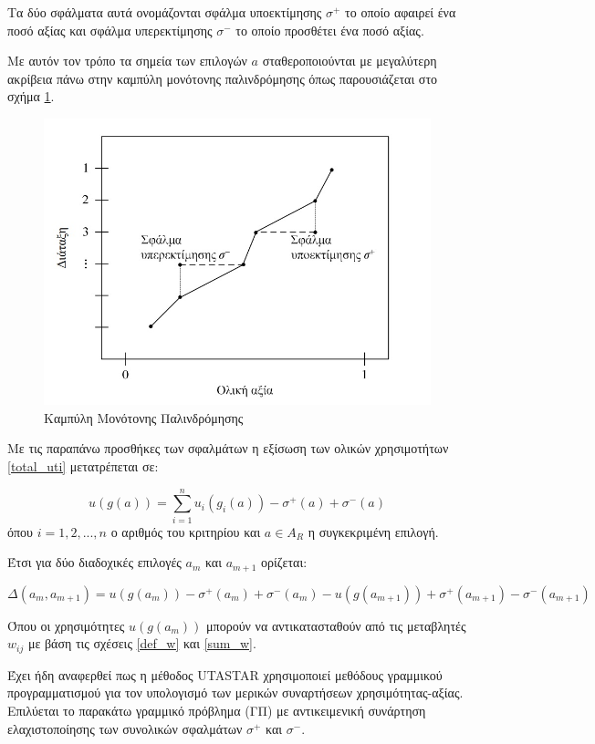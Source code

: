 \documentclass[11pt,a4paper,titlepage]{article}
\numberwithin{equation}{section}
\begin{document}
Τα δύο σφάλματα αυτά ονομάζονται σφάλμα υποεκτίμησης $σ^{+}$ το οποίο αφαιρεί ένα ποσό αξίας και σφάλμα υπερεκτίμησης $σ^{-}$ το οποίο προσθέτει ένα ποσό αξίας.

Με αυτόν τον τρόπο τα σημεία των επιλογών $a$ σταθεροποιούνται με μεγαλύτερη ακρίβεια πάνω στην καμπύλη μονότονης παλινδρόμησης όπως παρουσιάζεται στο σχήμα \ref{fig:graph_monot}.

\begin{figure}[H]
	\centering
	\includegraphics[width=0.7\linewidth]{media/graph_mono.jpg}
	\caption{Καμπύλη Μονότονης Παλινδρόμησης}
	\label{fig:graph_monot}
\end{figure}

Με τις παραπάνω προσθήκες των σφαλμάτων η εξίσωση των ολικών χρησιμοτήτων \ref{total_uti} μετατρέπεται σε:

\begin{equation}\label{total_uti_fin}
	u(g(a)) = \sum_{i=1}^{n} u_{i}(g_{i}(a)) - σ^{+}(a) + σ^{-}(a)
\end{equation}
όπου $i = 1,2,...,n$ ο αριθμός του κριτηρίου και $a\in A_{R}$ η συγκεκριμένη επιλογή.

Έτσι για δύο διαδοχικές επιλογές $a_{m}$ και $a_{m+1}$ ορίζεται:

\begin{equation}\label{def_deltas}
	Δ(a_{m}, a_{m+1}) = u(g(a_{m})) - σ^{+}(a_{m}) + σ^{-}(a_{m}) - u(g(a_{m+1})) + σ^{+}(a_{m+1}) - σ^{-}(a_{m+1})
\end{equation}

Όπου οι χρησιμότητες $u(g(a_{m}))$ μπορούν να αντικατασταθούν από τις μεταβλητές $w_{ij}$ με βάση τις σχέσεις \ref{def_w} και \ref{sum_w}.
 
Έχει ήδη αναφερθεί πως η μέθοδος UTASTAR χρησιμοποιεί μεθόδους γραμμικού προγραμματισμού για τον υπολογισμό των μερικών συναρτήσεων χρησιμότητας-αξίας. Επιλύεται το παρακάτω γραμμικό πρόβλημα (ΓΠ) με αντικειμενική συνάρτηση ελαχιστοποίησης των συνολικών σφαλμάτων $σ^{+}$ και $σ^{-}$.
\end{document}
